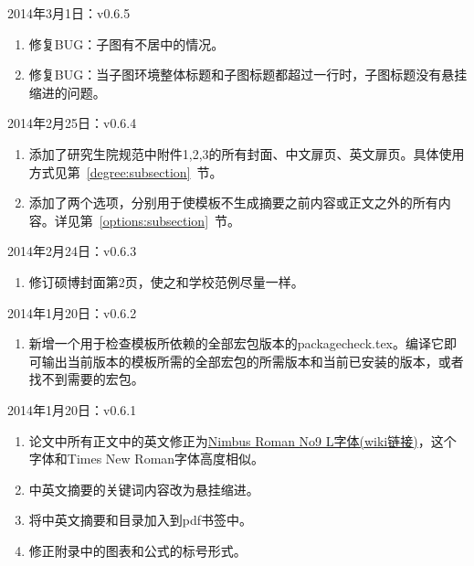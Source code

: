 \noindent
2014年3月1日：v0.6.5
\begin{enumerate}
\item 修复BUG：子图有不居中的情况。
\item 修复BUG：当子图环境整体标题和子图标题都超过一行时，子图标题没有悬挂缩进的问题。
\end{enumerate}

\noindent
2014年2月25日：v0.6.4
\begin{enumerate}
\item 添加了研究生院规范中附件1,2,3的所有封面、中文扉页、英文扉页。具体使用方式见第~\ref{degree:subsection}~节。
\item 添加了两个选项，分别用于使模板不生成摘要之前内容或正文之外的所有内容。详见第~\ref{options:subsection}~节。

\end{enumerate}

\noindent
2014年2月24日：v0.6.3
\begin{enumerate}
\item 修订硕博封面第2页，使之和学校范例尽量一样。

\end{enumerate}

\noindent
2014年1月20日：v0.6.2
\begin{enumerate}
\item 新增一个用于检查模板所依赖的全部宏包版本的packagecheck.tex。编译它即可输出当前版本的模板所需的全部宏包的所需版本和当前已安装的版本，或者找不到需要的宏包。

\end{enumerate}

\noindent
2014年1月20日：v0.6.1
\begin{enumerate}
\item 论文中所有正文中的英文修正为\href{http://en.wikipedia.org/wiki/Nimbus_Roman_No9_L}{Nimbus Roman No9 L字体(wiki链接)}，这个字体和Times New Roman字体高度相似。
\item 中英文摘要的关键词内容改为悬挂缩进。
\item 将中英文摘要和目录加入到pdf书签中。
\item 修正附录中的图表和公式的标号形式。

\end{enumerate}

